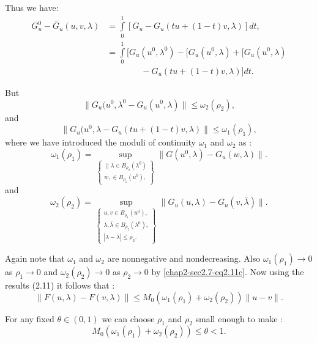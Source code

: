Thus we have:
\begin{align*}
G^0_u - \tilde{G_u} (u, v, \lambda) & = \int \limits^1_0 [G_u - G_u
  (tu + (1-t) v, \lambda)] dt, \\ 
& = \int \limits^1_0 [G_u (u^0 , \lambda^0)  - [G_u (u^0, \lambda) +
    [G_u (u^0, \lambda) \\  
&   \qquad \qquad -  G_u (tu + (1-t) v, \lambda)] dt.\tag{2.11b}  
\label{chap2-sec2.7-eq2.11b}    
\end{align*}

But\pageoriginale 
\begin{equation*}
\| G_u (u^0, \lambda^0 - G_u (u^0, \lambda) \| \le \omega_2 (\rho_2),
\tag{2.11c}\label{chap2-sec2.7-eq2.11c}     
\end{equation*}
and 
\begin{equation*}
\| G_u (u^0, \lambda - G_u (tu + (1-t)v, \lambda) \| \le \omega_1
(\rho_1), \tag{2.11d}\label{chap2-sec2.7-eq2.11d}     
\end{equation*}
where we have introduced the moduli of continuity $\omega_1$ and
$\omega_2$ as : 
$$
\omega_1 (\rho_1) = \sup_{\left \{ 
\begin{matrix}
\| \lambda \in B_{\rho_2} (\lambda^0) \\
w, \in B_{\rho_1} (u^0),  
\end{matrix}
\right \}} \| G(u^0 ,\lambda) - G_u(w, {\lambda}) \|.
$$
and
$$
\omega_2 (\rho_2) = \sup_{\left \{ 
\begin{matrix}
 u, v \in B_{\rho_1} (u^0), \\
\lambda,\bar{\lambda} \in B_{\rho_2} (\lambda^0) ,\\
|\lambda - \bar{\lambda}| \le \rho_2. 
\end{matrix}
\right \}} \| G_u(u,\lambda) - G_u(v, \bar{\lambda}) \|. 
$$

Again note that $\omega_1$ and $\omega_2$ are nonnegative and
nondecreasing. Also $\omega_1(\rho_1) \rightarrow 0$ as $\rho_1
\rightarrow 0$ and $\omega_2 (\rho_2) \rightarrow 0$ as $\rho_2
\rightarrow 0$ by \eqref{chap2-sec2.7-eq2.11c}. Now using the results
(2.11) it follows that : 
\begin{equation*}
\| F(u, \lambda) - F(v, \lambda) \| \le M_0 (\omega_1(\rho_1) +
\omega_2(\rho_2)) \| u-v\|. \tag{2.12}\label{chap2-sec2.7-eq2.12}
\end{equation*}

For any fixed $\theta \in (0,1)$ we can choose $\rho_1$ and $\rho_2$
small enough to make : 
\begin{equation*}
 M_0 (\omega_1(\rho_1) + \omega_2(\rho_2)) \le \theta < 1.  \tag{2.13a}\label{chap2-sec2.7-eq2.13a}      
\end{equation*}

